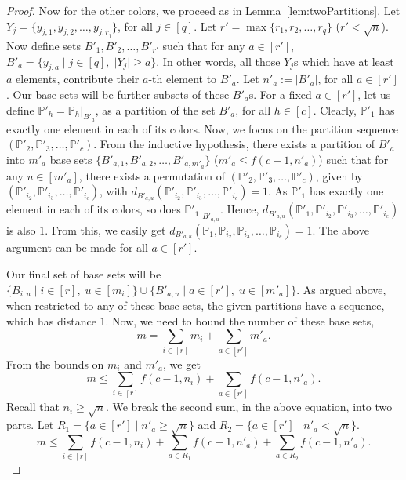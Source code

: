 \documentclass[final,oneeqnum, onethmnum, onefignum]{siamltex1213}
\renewcommand{\P}{\mathbb P}
\newcommand{\abs}[1]{\lvert #1 \rvert}
\begin{document}
\begin{proof}
Now for the other colors, 
we proceed as in Lemma~\ref{lem:twoPartitions}.
Let $Y_j = \{y_{j,1}, y_{j,2}, \dots, y_{j, r_j} \}$, for all $j \in [q]$.
Let $r' = \max\{ r_1, r_2, \dots, r_q\}$ ($r' < \sqrt{n}$). 
Now define sets $B'_1, B'_2, \dots, B'_{r'}$ such that
for any $a \in [r']$, $B'_a = \{y_{j,a} \mid j \in [q], \; \abs{Y_j} \geq a \} $. 
In other words, all those $Y_j$s which have at least $a$ elements, contribute
their $a$-th element to $B'_a$.
Let $n'_a := \abs{B'_a}$, for all $a \in [r']$.
Our base sets will be further subsets of these $B'_a$s. 
For a fixed $a \in [r']$, let us define $\P'_h = \P_h|_{B'_a} $, 
as a partition of the set $B'_a$,
for all $h \in [c]$.
Clearly, $\P'_1$ has exactly one element in each of its colors. 
Now, we focus on the partition sequence $(\P'_2, \P'_3, \dots, \P'_c)$.
From the inductive hypothesis, 
there exists a partition of $B'_a$ into $m'_a$ base sets
$\{ B'_{a,1}, B'_{a,2}, \dots, B'_{a,m'_a} \}$ ($m'_a \leq f(c-1, n'_a)$) such that 
for any $u \in [m'_a]$, there exists a permutation of 
$(\P'_2, \P'_3, \dots, \P'_c)$, given by $(\P'_{i_2}, \P'_{i_3}, \dots, \P'_{i_c})$,  
with $d_{B'_{a,u}} (\P'_{i_2}, \P'_{i_3}, \dots, \P'_{i_c}) = 1$.
As $\P'_1$ has exactly one element in each of its colors, so does $\P'_1|_{B'_{a,u}}$. 
Hence, $d_{B'_{a,u}} (\P'_1, \P'_{i_2}, \P'_{i_3}, \dots, \P'_{i_c})$ is also $1$.
From this, we easily get $d_{B'_{a,u}} (\P_1, \P_{i_2}, \P_{i_3}, \dots, \P_{i_c}) = 1$.
The above argument can be made for all $a \in [r']$.

Our final set of base sets will be $\{B_{i,u} \mid i \in [r], \; u \in [m_i] \} \cup
\{ B'_{a,u} \mid a \in [r'], \; u \in [m'_a] \}$. 
As argued above, when restricted to any of these base sets, the given partitions 
have a sequence, which has distance $1$. 
Now, we need to bound the number of these base sets, 
$$m = \sum_{i \in [r]} m_i + \sum_{a \in [r']} m'_a .$$
From the bounds on $m_i$ and $m'_a$, we get
$$m \leq \sum_{i \in [r]} f(c-1, n_i) + \sum_{a \in [r']} f(c-1, n'_a) .$$
Recall that $n_i \geq \sqrt{n}$. 
We break the second sum, in the above equation,
into two parts.
Let $R_1 = \{a \in [r'] \mid n'_a \geq \sqrt{n} \}$ 
and $R_2 = \{ a \in [r'] \mid n'_a < \sqrt{n} \}$.
\begin{equation}
\label{eq:threeParts}
m \leq \sum_{i \in [r]} f(c-1, n_i) +  \sum_{a \in R_1} f(c-1, n'_a) + \sum_{a \in R_2} f(c-1, n'_a).
\end{equation}


\end{proof}
\end{document}
